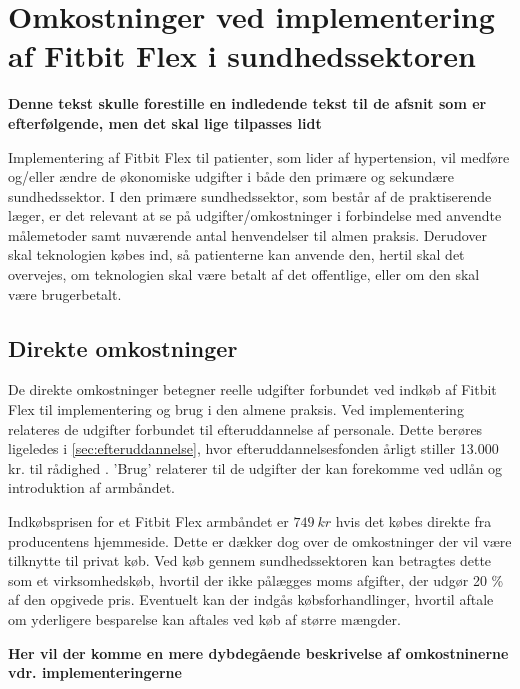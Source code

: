 
\section{Omkostninger ved implementering af Fitbit Flex i sundhedssektoren}

\textbf{Denne tekst skulle forestille en indledende tekst til de afsnit som er efterfølgende, men det skal lige tilpasses lidt} 

Implementering af Fitbit Flex til patienter, som lider af hypertension, vil medføre og/eller ændre de økonomiske udgifter i både den primære og sekundære sundhedssektor. I den primære sundhedssektor, som består af de praktiserende læger, er det relevant at se på udgifter/omkostninger i forbindelse med anvendte målemetoder samt nuværende antal henvendelser til almen praksis. Derudover skal teknologien købes ind, så patienterne kan anvende den, hertil skal det overvejes, om teknologien skal være betalt af det offentlige, eller om den skal være brugerbetalt. 


\subsection{Direkte omkostninger}
De direkte omkostninger betegner reelle udgifter forbundet ved indkøb af Fitbit Flex til implementering og brug i den almene praksis.  
Ved implementering relateres de udgifter forbundet til efteruddannelse af personale. Dette berøres ligeledes i \autoref{sec:efteruddannelse}, hvor efteruddannelsesfonden årligt stiller 13.000 kr. til rådighed \citep{vedsted2005}.  
'Brug' relaterer til de udgifter der kan forekomme ved udlån og introduktion af armbåndet. 

Indkøbsprisen for et Fitbit Flex armbåndet er $749\ kr$ hvis det købes direkte fra producentens hjemmeside. Dette er dækker dog over de omkostninger der vil være tilknytte til privat køb. 
Ved køb gennem sundhedssektoren kan betragtes dette som et virksomhedskøb, hvortil der ikke pålægges moms afgifter, der udgør 20 \% af den opgivede pris. 
Eventuelt kan der indgås købsforhandlinger, hvortil aftale om yderligere besparelse kan aftales ved køb af større mængder. 

 \textbf{Her vil der komme en mere dybdegående beskrivelse af omkostninerne vdr. implementeringerne}

